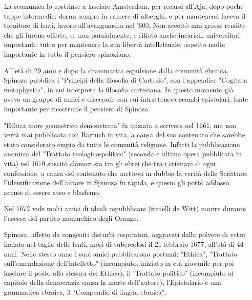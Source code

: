 La scomunica lo costrinse a lasciare Amsterdam, per recarsi all'Aja, dopo poche tappe intermedie: dormì sempre in camere di alberghi, e per mantenersi faceva il tornitore di lenti, lavoro all'avanguardia nel '600. Non accettò mai grosse rendite che gli furono offerte, se non parzialmente, e rifiutò anche incarichi universitari importanti: tutto per mantenere la sua libertà intellettuale, aspetto molto importante in tutto il pensiero spinoziano.

All'età di 29 anni e dopo la drammatica espulsione dalla comunità ebraica, Spinoza pubblica i "Principi della filosofia di Cartesio", con l'appendice "Cogitata metaphysica", in cui interpreta la filosofia cartesiana. In questo momento già aveva un gruppo di amici e discepoli, con cui intratteneva scambi epistolari, fonte importante per ricostruite il pensiero di Spinoza.

"Ethica more geometrico demonstrata" fu iniziata a scrivere nel 1661, ma non verrà mai pubblicata con Barruch in vita, a causa del suo contenuto che sarebbe stato considerato empio da tutte le comunità religione. Infatti la pubblicazione anonima del "Trattato teologico-politico" (seconda e ultima opera pubblicata in vita) nel 1670 suscitò clamori sia tra gli ebrei che tra i cristiani di ogni confessione, a causa del contenuto che metteva in dubbio la verità delle Scritture: l'identificazione dell'autore in Spinoza fu rapida, e questo gli portò addosso accuse di essere ateo e blasfemo.

Nel 1672 vide molti amici di ideali repubblicani (fratelli de Witt) morire durante l'ascesa del partito monarchico degli Orange.

Spinoza, affetto da congeniti disturbi respiratori, aggravati dalla polvere di vetro inalata nel taglio delle lenti, morì di tubercolosi il 21 febbraio 1677, all'età di 44 anni. Nello stesso anno i suoi amici pubblicarono postumi: "Ethica", "Trattato sull'emendazione dell'intelletto" (incompiuto, iniziato in età giovanile per poi lasciare il posto alla stesura del Ethica), il "Trattato politico" (incompiuto al capitolo della democrazia causa la morte dell'autore), l'Epistolario e una grammatica ebraica, il "Compendio di lingua ebraica".
